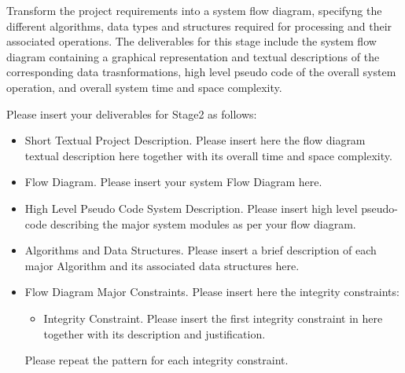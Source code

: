 \textnormal{
Transform the project requirements into a system flow diagram, specifyng the different algorithms, data types and structures required for processing and their associated operations.  
The deliverables for this stage include the system flow diagram containing a graphical representation and  textual descriptions of the corresponding data trasnformations, high level pseudo code of the overall system operation, and overall system time and space complexity.}


Please insert your deliverables for Stage2 as follows:
\begin{itemize} 
\item{  Short Textual Project Description. }
Please insert here the flow diagram textual description here together with its overall time and space complexity.
\item{ Flow Diagram. }
Please insert your system Flow Diagram here.
\item{ High Level Pseudo Code System Description. }
Please insert high level pseudo-code describing the major system modules as per your flow diagram.
\item{Algorithms and  Data Structures. }
Please insert a brief description of each major Algorithm and its associated data structures here.
\end{itemize}

\begin{itemize} 
\item{  Flow Diagram Major Constraints.}
Please insert here the integrity constraints:
\begin{itemize} 
\item{ Integrity Constraint. }
Please insert the first integrity constraint in here together with its description and justification. 
\end{itemize}
Please repeat the pattern for each integrity constraint.
\end{itemize}
